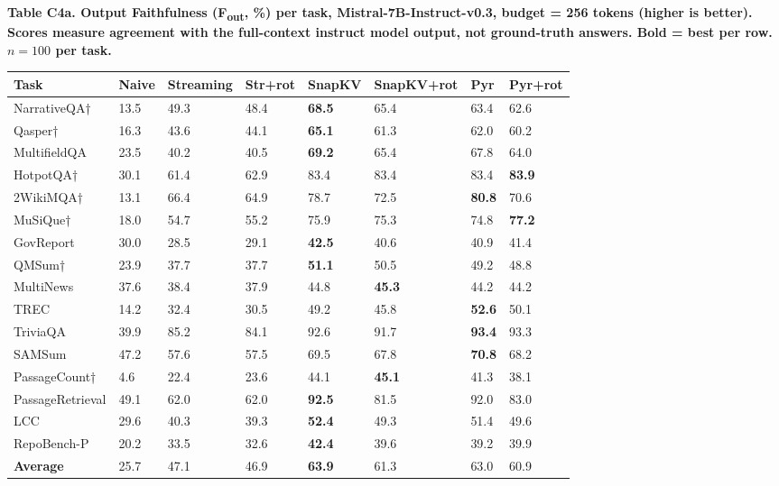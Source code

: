 \documentclass[10pt,letterpaper]{article}
\begin{document}
\textbf{Table C4a. Output Faithfulness (F\textsubscript{out}, \%) per task, Mistral-7B-Instruct-v0.3,
budget = 256 tokens (higher is better). Scores measure agreement with the full-context
instruct model output, not ground-truth answers. Bold = best per row.
$n = 100$ per task.}

\begin{table}[H]
\centering
\small
\begin{tabular}{@{}llllllll@{}}
\toprule
Task & Naive & Streaming & Str+rot & SnapKV & SnapKV+rot & Pyr &
Pyr+rot\\
\midrule
NarrativeQA† & 13.5 & 49.3 & 48.4 & \textbf{68.5} & 65.4 & 63.4 &
62.6\\
Qasper† & 16.3 & 43.6 & 44.1 & \textbf{65.1} & 61.3 & 62.0 &
60.2\\
MultifieldQA & 23.5 & 40.2 & 40.5 & \textbf{69.2} & 65.4 & 67.8 &
64.0\\
HotpotQA† & 30.1 & 61.4 & 62.9 & 83.4 & 83.4 & 83.4 &
\textbf{83.9}\\
2WikiMQA† & 13.1 & 66.4 & 64.9 & 78.7 & 72.5 & \textbf{80.8} &
70.6\\
MuSiQue† & 18.0 & 54.7 & 55.2 & 75.9 & 75.3 & 74.8 &
\textbf{77.2}\\
GovReport & 30.0 & 28.5 & 29.1 & \textbf{42.5} & 40.6 & 40.9 &
41.4\\
QMSum† & 23.9 & 37.7 & 37.7 & \textbf{51.1} & 50.5 & 49.2 &
48.8\\
MultiNews & 37.6 & 38.4 & 37.9 & 44.8 & \textbf{45.3} & 44.2 &
44.2\\
TREC & 14.2 & 32.4 & 30.5 & 49.2 & 45.8 & \textbf{52.6} &
50.1\\
TriviaQA & 39.9 & 85.2 & 84.1 & 92.6 & 91.7 & \textbf{93.4} &
93.3\\
SAMSum & 47.2 & 57.6 & 57.5 & 69.5 & 67.8 & \textbf{70.8} &
68.2\\
PassageCount† & 4.6 & 22.4 & 23.6 & 44.1 & \textbf{45.1} & 41.3 &
38.1\\
PassageRetrieval & 49.1 & 62.0 & 62.0 & \textbf{92.5} & 81.5 & 92.0 &
83.0\\
LCC & 29.6 & 40.3 & 39.3 & \textbf{52.4} & 49.3 & 51.4 &
49.6\\
RepoBench-P & 20.2 & 33.5 & 32.6 & \textbf{42.4} & 39.6 & 39.2 &
39.9\\
\textbf{Average} & 25.7 & 47.1 & 46.9 & \textbf{63.9} & 61.3 & 63.0 &
60.9\\
\bottomrule
\end{tabular}
\end{table}
\end{document}
